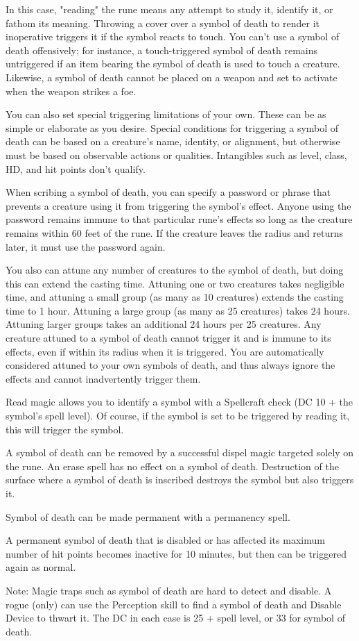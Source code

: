 {In this case, "reading" the rune means any attempt to study it, identify it, or fathom its meaning. Throwing a cover over a symbol of death to render it inoperative triggers it if the symbol reacts to touch. You can't use a symbol of death offensively; for instance, a touch-triggered symbol of death remains untriggered if an item bearing the symbol of death is used to touch a creature. Likewise, a symbol of death cannot be placed on a weapon and set to activate when the weapon strikes a foe.

You can also set special triggering limitations of your own. These can be as simple or elaborate as you desire. Special conditions for triggering a symbol of death can be based on a creature's name, identity, or alignment, but otherwise must be based on observable actions or qualities. Intangibles such as level, class, HD, and hit points don't qualify.

When scribing a symbol of death, you can specify a password or phrase that prevents a creature using it from triggering the symbol's effect. Anyone using the password remains immune to that particular rune's effects so long as the creature remains within 60 feet of the rune. If the creature leaves the radius and returns later, it must use the password again.

You also can attune any number of creatures to the symbol of death, but doing this can extend the casting time. Attuning one or two creatures takes negligible time, and attuning a small group (as many as 10 creatures) extends the casting time to 1 hour. Attuning a large group (as many as 25 creatures) takes 24 hours. Attuning larger groups takes an additional 24 hours per 25 creatures. Any creature attuned to a symbol of death cannot trigger it and is immune to its effects, even if within its radius when it is triggered. You are automatically considered attuned to your own symbols of death, and thus always ignore the effects and cannot inadvertently trigger them.

Read magic allows you to identify a symbol with a Spellcraft check (DC 10 + the symbol's spell level). Of course, if the symbol is set to be triggered by reading it, this will trigger the symbol.

A symbol of death can be removed by a successful dispel magic targeted solely on the rune. An erase spell has no effect on a symbol of death. Destruction of the surface where a symbol of death is inscribed destroys the symbol but also triggers it.

Symbol of death can be made permanent with a permanency spell.

A permanent symbol of death that is disabled or has affected its maximum number of hit points becomes inactive for 10 minutes, but then can be triggered again as normal.

Note: Magic traps such as symbol of death are hard to detect and disable. A rogue (only) can use the Perception skill to find a symbol of death and Disable Device to thwart it. The DC in each case is 25 + spell level, or 33 for symbol of death.}
        
